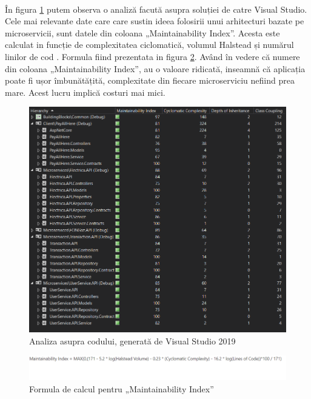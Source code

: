 \documentclass[12pt]{report}
\begin{document}
  	\paragraph{}În figura \ref{compara} putem observa o analiză facută asupra soluției de catre Visual Studio. Cele mai relevante date care care sustin ideea folosirii unui arhitecturi bazate pe microservicii, sunt datele din coloana „Maintainability Index”. Acesta este calculat in funcție de complexitatea ciclomatică, volumul Halstead și numărul linilor de cod \cite{oman1992metrics}. Formula fiind prezentata in figura \ref{formula}. Având în vedere că numere din coloana „Maintainability Index”, au o valoare ridicată, inseamnă că aplicația poate fi ușor îmbunătățită, complexitate din fiecare microserviciu nefiind prea mare. Acest lucru implică costuri mai mici.
  	\begin{figure}[h]
  	\centering
  	\includegraphics[scale=0.85]{comapara}
	\caption{Analiza asupra codului, generată de Visual Studio 2019}  
	\label{compara}
  	\end{figure}
  	\begin{figure}[h]
  	\centering
  	\includegraphics[scale=0.75]{formula}
	\caption{Formula de calcul pentru „Maintainability Index”}  
	\label{formula}
  	\end{figure}
\end{document}
